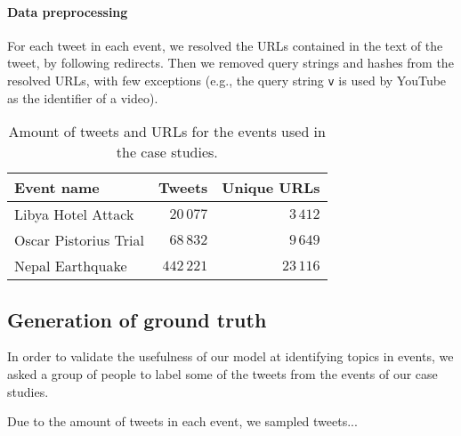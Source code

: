 \documentclass{article}
\begin{document}
\paragraph{Data preprocessing} For each tweet in each event, we
resolved the URLs contained in the text of the tweet, by following
redirects. Then we removed query strings and hashes from the resolved
URLs, with few exceptions (e.g., the query string \texttt{v} is used
by YouTube as the identifier of a video).

\begin{table}[]
\begin{tabularx}{\textwidth}{@{}Xrr@{}}
\toprule
Event name            & Tweets & Unique URLs \\ \midrule
Libya Hotel Attack    & $20\,077$  & $3\,412$        \\
Oscar Pistorius Trial & $68\,832$  & $9\,649$        \\
Nepal Earthquake      & $442\,221$ & $23\,116$       \\ \bottomrule
\end{tabularx}
\caption{Amount of tweets and URLs for the events used in the case studies.}
\label{tab:cs-events}
\end{table}


\subsection{Generation of ground truth}

In order to validate the usefulness of our model at identifying topics
in events, we asked a group of people to label some of the tweets from
the events of our case studies.

Due to the amount of tweets in each event, we sampled tweets...
\end{document}
